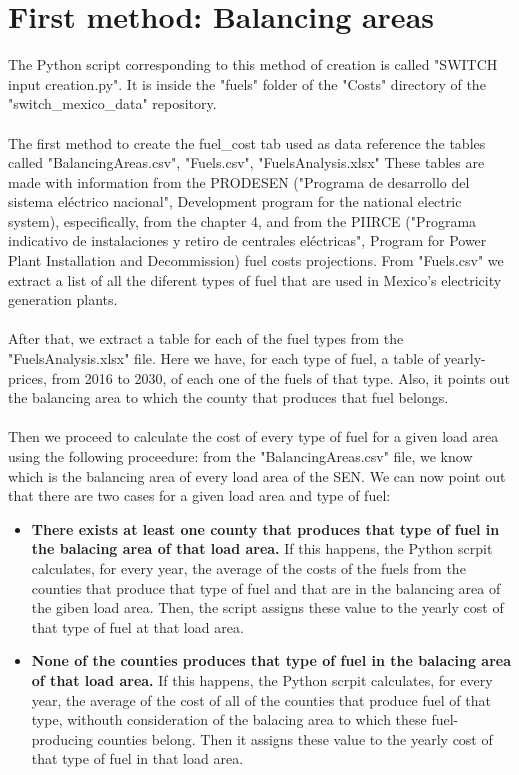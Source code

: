 \documentclass{article}
\begin{document}
\section{First method: Balancing areas}
The Python script corresponding to this method of creation is called "SWITCH input creation.py". It is inside the "fuels" folder of the "Costs" directory of the "switch\_mexico\_data" repository.
\\
\\The first method to create the fuel\_cost tab used as data reference the tables called "BalancingAreas.csv", "Fuels.csv", "FuelsAnalysis.xlsx" These tables are made with information from the PRODESEN ("Programa de desarrollo del sistema eléctrico nacional", Development program for the national electric system)\cite{prodesen}, especifically, from the chapter 4\cite{prodesen4}, and from the PIIRCE ("Programa indicativo de instalaciones y retiro de centrales eléctricas", Program for Power Plant Installation and Decommission) fuel costs projections\cite{piircef}. From "Fuels.csv" we extract a list of all the diferent types of fuel that are used in Mexico's electricity generation plants.
\\
\\After that, we extract a table for each of the fuel types from the "FuelsAnalysis.xlsx" file. Here we have, for each type of fuel, a table of yearly-prices, from 2016 to 2030, of each one of the fuels of that type. Also, it points out the balancing area to which the county that produces that fuel belongs.
\\
\\Then we proceed to calculate the cost of every type of fuel for a given load area using the following proceedure: from the "BalancingAreas.csv" file, we know which is the balancing area of every load area of the SEN. We can now point out that there are two cases for a given load area and type of fuel:
\begin{itemize}
\item \textbf{There exists at least one county that produces that type of fuel in the balacing area of that load area.} If this happens, the Python scrpit calculates, for every year, the average of the costs of the fuels from the counties that produce that type of fuel and that are in the balancing area of the giben load area. Then, the script assigns these value to the yearly cost of that type of fuel at that load area.
\item \textbf{None of the counties produces that type of fuel in the balacing area of that load area.} If this happens, the Python scrpit calculates, for every year, the average of the cost of all of the counties that produce fuel of that type, withouth consideration of the balacing area to which these fuel-producing counties belong. Then it assigns these value to the yearly cost of that type of fuel in that load area.
\end{itemize}
\end{document}
